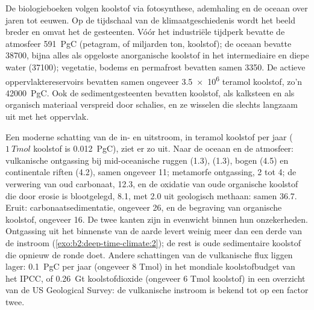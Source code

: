 De biologieboeken volgen koolstof via fotosynthese, ademhaling en de oceaan over jaren tot
eeuwen. Op de tijdschaal van de klimaatgeschiedenis wordt het beeld breder en omvat het de gesteenten. Vóór
het industriële tijdperk bevatte de atmosfeer \qty{591}{PgC} (petagram, of miljarden ton, koolstof);
de oceaan bevatte \num{38700}, bijna alles als opgeloste anorganische koolstof in het intermediaire en
diepe water (\num{37100}); vegetatie, bodems en permafrost bevatten samen \num{3350}. De
actieve oppervlaktereservoirs bevatten samen ongeveer \num{3.5e6} teramol koolstof, zo'n
\qty{42000}{PgC}. Ook de sedimentgesteenten bevatten koolstof, als kalksteen en als organisch materiaal
verspreid door schalies, en ze wisselen die slechts langzaam uit met het oppervlak.

Een moderne schatting van de in- en uitstroom, in teramol koolstof per jaar ($\qty{1}{Tmol}$
koolstof is \qty{0.012}{PgC}), ziet er zo uit. Naar de oceaan en de atmosfeer: vulkanische ontgassing bij
mid-oceanische ruggen (1.3),  (1.3), bogen (4.5) en continentale riften (4.2), samen ongeveer 11;
metamorfe ontgassing, 2 tot 4; de verwering van oud carbonaat, 12.3, en de oxidatie van
oude organische koolstof die door erosie is blootgelegd, 8.1, met 2.0 uit geologisch methaan: samen \num{36.7}.
Eruit: carbonaatsedimentatie, ongeveer 26, en de begraving van organische koolstof, ongeveer 16. De twee
kanten zijn in evenwicht binnen hun onzekerheden. Ontgassing uit het binnenste van de aarde levert weinig meer dan een
derde van de instroom (\cref{exo:b2:deep-time-climate:2}); de rest is oude sedimentaire koolstof die opnieuw
de ronde doet. Andere schattingen van de vulkanische flux liggen lager: \qty{0.1}{PgC} per jaar
(ongeveer 8 Tmol) in het mondiale koolstofbudget van het IPCC, of \qty{0.26}{Gt} koolstofdioxide (ongeveer 6
Tmol koolstof) in een overzicht van de US Geological Survey: de vulkanische instroom is bekend tot op een
factor twee.

